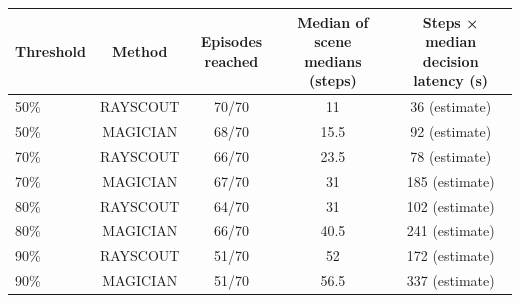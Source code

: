 \begin{tabular}{@{}lcccc@{}}
\toprule
Threshold & Method & Episodes reached & Median of scene medians (steps) & Steps × median decision latency (s) \\
\midrule
50\% & RAYSCOUT & 70/70 & 11 & 36 (estimate) \\
50\% & MAGICIAN & 68/70 & 15.5 & 92 (estimate) \\
70\% & RAYSCOUT & 66/70 & 23.5 & 78 (estimate) \\
70\% & MAGICIAN & 67/70 & 31 & 185 (estimate) \\
80\% & RAYSCOUT & 64/70 & 31 & 102 (estimate) \\
80\% & MAGICIAN & 66/70 & 40.5 & 241 (estimate) \\
90\% & RAYSCOUT & 51/70 & 52 & 172 (estimate) \\
90\% & MAGICIAN & 51/70 & 56.5 & 337 (estimate) \\
\bottomrule
\end{tabular}
